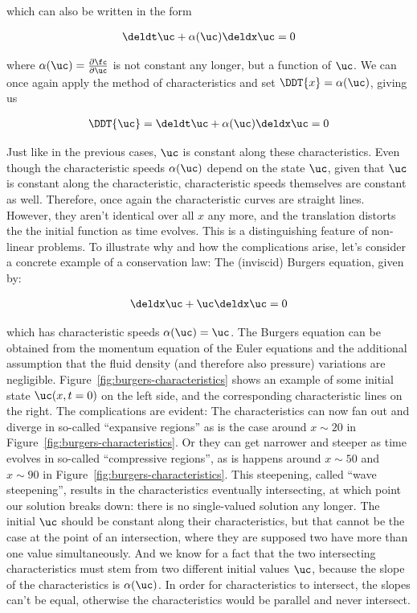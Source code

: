 which can also be written in the form

\begin{align}
    \deldt \uc + \alpha(\uc) \deldx \uc = 0
\end{align}

where $\alpha(\uc) = \frac{\partial \fc}{\partial \uc}$ is not constant any longer, but a function
of $\uc$. We can once again apply the method of characteristics and set $\DDT{x} = \alpha(\uc)$,
giving us

\begin{align}
    \DDT{\uc} = \deldt \uc + \alpha(\uc) \deldx \uc = 0
\end{align}

Just like in the previous cases, $\uc$ is constant along these characteristics. Even though the
characteristic speeds $\alpha(\uc)$ depend on the state $\uc$, given that $\uc$ is constant along
the characteristic, characteristic speeds themselves are constant as well. Therefore, once again
the characteristic curves are straight lines. However, they aren't identical over all $x$ any more,
and the translation distorts the the initial function as time evolves. This is a distinguishing
feature of non-linear problems. To illustrate why and how the complications arise, let's consider a
concrete example of a conservation law: The (inviscid) Burgers equation, given by:

\begin{align}
    \deldx \uc + \uc \deldx \uc = 0  \label{eq:inviscid-burgers}
\end{align}


which has characteristic speeds $\alpha(\uc) = \uc$. The Burgers equation can be obtained from the
momentum equation of the Euler equations and the additional assumption that the fluid density (and
therefore also pressure) variations are negligible. Figure~\ref{fig:burgers-characteristics} shows
an example of some initial state $\uc(x, t=0)$ on the left side, and the corresponding
characteristic lines on the right. The complications are evident: The characteristics can now fan
out and diverge in so-called ``expansive regions'' as is the case around $x \sim 20$ in
Figure~\ref{fig:burgers-characteristics}. Or they can get narrower and steeper as time evolves in
so-called ``compressive regions'', as is happens around $x \sim 50$ and $x \sim 90$ in
Figure~\ref{fig:burgers-characteristics}. This steepening, called ``wave steepening'', results in
the characteristics eventually intersecting, at which point our solution breaks down: there is no
single-valued solution any longer. The initial $\uc$ should be constant along their
characteristics, but that cannot be the case at the point of an intersection, where they are
supposed two have more than one value simultaneously. And we know  for a fact that the two
intersecting characteristics must stem from two different initial values $\uc$, because the slope of
the characteristics is $\alpha(\uc)$. In order for characteristics to intersect, the slopes can't be
equal, otherwise the characteristics would be parallel and never intersect.

